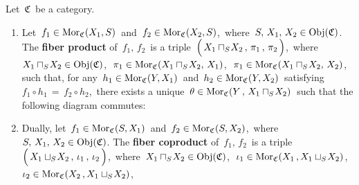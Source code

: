 
\vskip 0.5cm
\begin{definition}
\mbox{}
\vskip 0.15cm
\noindent
Let \,$\mathfrak{C}$\, be a category.
\begin{enumerate}
\item
	Let
	\,$f_{1} \in \textnormal{Mor}_{\mathfrak{C}}(X_{1},S)$\,
	and
	\,$f_{2} \in \textnormal{Mor}_{\mathfrak{C}}(X_{2},S)$,\,
	where
	\,$S,\, X_{1},\, X_{2} \in \textnormal{Obj}(\mathfrak{C})$.
	The \textbf{fiber product} of \,$f_{1},\, f_{2}$\,
		is a triple
	\,$\left(\,X_{1}\overset{{\color{white}.}}{\sqcap_{S}}\!X_{2} \,,\, \pi_{1} \,,\, \pi_{2}\,\right)$,\,
	where
	\,$X_{1}\sqcap_{S}\!X_{2} \in \textnormal{Obj}(\mathfrak{C})$,\,
	\,$\pi_{1} \in \textnormal{Mor}_{\mathfrak{C}}(X_{1}\sqcap_{S}\!X_{2},\,X_{1})$,\,
	\,$\pi_{1} \in \textnormal{Mor}_{\mathfrak{C}}(X_{1}\sqcap_{S}\!X_{2},\,X_{2})$,\,
	such that, for any
	\,$h_{1} \in \textnormal{Mor}_{\mathfrak{C}}(Y,X_{1})$\,
	and
	\,$h_{2} \in \textnormal{Mor}_{\mathfrak{C}}(Y,X_{2})$\,
	satisfying
	\,$f_{1} \circ h_{1} \,=\, f_{2} \circ h_{2}$,\,
	there exists a unique
	\,$\theta \in \textnormal{Mor}_{\mathfrak{C}}(Y\,,\,X_{1}\sqcap_{S}\!X_{2})$\,
	such that the following diagram commutes:
	\begin{center}
	\end{center}
\item
	Dually, let
	\,$f_{1} \in \textnormal{Mor}_{\mathfrak{C}}(S,X_{1})$\,
	and
	\,$f_{2} \in \textnormal{Mor}_{\mathfrak{C}}(S,X_{2})$,\,
	where
	\,$S,\, X_{1},\, X_{2} \in \textnormal{Obj}(\mathfrak{C})$.
	The \textbf{fiber coproduct} of \,$f_{1},\, f_{2}$\,
		is a triple
	\,$\left(\,X_{1}\overset{{\color{white}.}}{\sqcup_{S}}\!X_{2} \,,\, \iota_{1} \,,\, \iota_{2}\,\right)$,\,
	where
	\,$X_{1}\sqcap_{S}\!X_{2} \in \textnormal{Obj}(\mathfrak{C})$,\,
	\,$\iota_{1} \in \textnormal{Mor}_{\mathfrak{C}}(X_{1}\,,X_{1}\sqcup_{S}\!X_{2})$,\,
	\,$\iota_{2} \in \textnormal{Mor}_{\mathfrak{C}}(X_{2}\,,X_{1}\sqcup_{S}\!X_{2})$,\,

\end{enumerate}
\end{definition}
